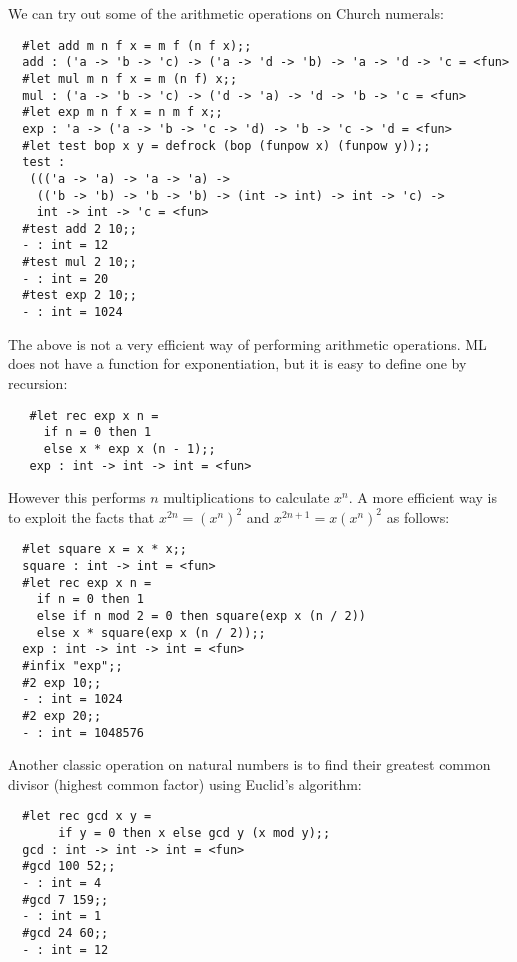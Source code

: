 \noindent We can try out some of the arithmetic operations on Church numerals:

\begin{boxed}\begin{verbatim}
  #let add m n f x = m f (n f x);;
  add : ('a -> 'b -> 'c) -> ('a -> 'd -> 'b) -> 'a -> 'd -> 'c = <fun>
  #let mul m n f x = m (n f) x;;
  mul : ('a -> 'b -> 'c) -> ('d -> 'a) -> 'd -> 'b -> 'c = <fun>
  #let exp m n f x = n m f x;;
  exp : 'a -> ('a -> 'b -> 'c -> 'd) -> 'b -> 'c -> 'd = <fun>
  #let test bop x y = defrock (bop (funpow x) (funpow y));;
  test :
   ((('a -> 'a) -> 'a -> 'a) ->
    (('b -> 'b) -> 'b -> 'b) -> (int -> int) -> int -> 'c) ->
    int -> int -> 'c = <fun>
  #test add 2 10;;
  - : int = 12
  #test mul 2 10;;
  - : int = 20
  #test exp 2 10;;
  - : int = 1024
\end{verbatim}\end{boxed}

The above is not a very efficient way of performing arithmetic operations. ML
does not have a function for exponentiation, but it is easy to define one by
recursion:

\begin{boxed}\begin{verbatim}
   #let rec exp x n =
     if n = 0 then 1
     else x * exp x (n - 1);;
   exp : int -> int -> int = <fun>
\end{verbatim}\end{boxed}

However this performs $n$ multiplications to calculate $x^n$. A more efficient
way is to exploit the facts that $x^{2 n} = (x^n)^2$ and $x^{2 n + 1} = x
(x^n)^2$ as follows:

\begin{boxed}\begin{verbatim}
  #let square x = x * x;;
  square : int -> int = <fun>
  #let rec exp x n =
    if n = 0 then 1
    else if n mod 2 = 0 then square(exp x (n / 2))
    else x * square(exp x (n / 2));;
  exp : int -> int -> int = <fun>
  #infix "exp";;
  #2 exp 10;;
  - : int = 1024
  #2 exp 20;;
  - : int = 1048576
\end{verbatim}\end{boxed}

Another classic operation on natural numbers is to find their greatest common
divisor (highest common factor) using Euclid's algorithm:

\begin{boxed}\begin{verbatim}
  #let rec gcd x y =
       if y = 0 then x else gcd y (x mod y);;
  gcd : int -> int -> int = <fun>
  #gcd 100 52;;
  - : int = 4
  #gcd 7 159;;
  - : int = 1
  #gcd 24 60;;
  - : int = 12
\end{verbatim}\end{boxed}

